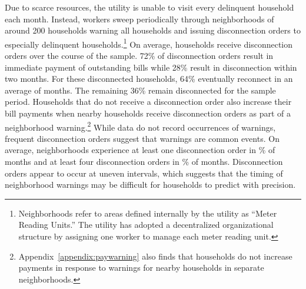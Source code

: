 \documentclass[12pt,table]{article}
\begin{document}
Due to scarce resources, the utility is unable to visit every delinquent household each month.  Instead, workers sweep periodically through neighborhoods of around 200 households warning all households and issuing disconnection orders to especially delinquent households.\footnote{Neighborhoods refer to areas defined internally by the utility as ``Meter Reading Units.''  The utility has adopted a decentralized organizational structure by assigning one worker to manage each meter reading unit.} On average, households receive disconnection orders over the course of the sample.  72\% of disconnection orders result in immediate payment of outstanding bills while 28\% result in disconnection within two months.  For these disconnected households, 64\% eventually reconnect in an average of months.  The remaining 36\% remain disconnected for the sample period.   Households that do not receive a disconnection order also increase their bill payments when nearby households receive disconnection orders as part of a neighborhood warning.\footnote{Appendix~\ref{appendix:paywarning} also finds that households do not increase payments in response to warnings for nearby households in separate neighborhoods.}  While data do not record occurrences of warnings, frequent disconnection orders suggest that warnings are common events.  On average, neighborhoods experience at least one disconnection order in \unskip\% of months and at least four disconnection orders in \unskip\% of months.  Disconnection orders appear to occur at uneven intervals, which suggests that the timing of neighborhood warnings may be difficult for households to predict with precision.






\end{document}
